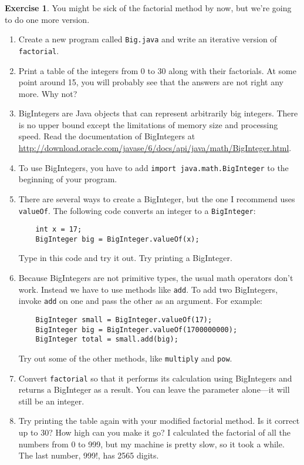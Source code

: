 \documentclass[12pt]{book}
\theoremstyle{definition}
\newtheorem{excz}{Exercise}[chapter]
\newenvironment{exercise}{\bigskip\begin{excz}\mbox{}}{\end{excz}}
\begin{document}
\begin{exercise}
\label{ex.biginteger}
You might be sick of the factorial
method by now, but we're going to do one more version.

\begin{enumerate}

\item Create a new program called {\tt Big.java} and
write an iterative version of {\tt factorial}.

\item Print a table of the integers from 0 to 30 along with their
factorials.  At some point around 15, you will probably see
that the answers are not right any more.  Why not?

\item BigIntegers are Java objects that can represent arbitrarily big
  integers.  There is no upper bound except the limitations of memory
  size and processing speed.  Read the documentation of BigIntegers at
  \url{http://download.oracle.com/javase/6/docs/api/java/math/BigInteger.html}.

\item To use BigIntegers, you have to add {\tt import
java.math.BigInteger} to the beginning of your program.

\item There are several ways to create a
BigInteger, but the one I recommend uses {\tt valueOf}.
The following code converts an integer to a {\tt BigInteger}:

\begin{lstlisting}
    int x = 17;
    BigInteger big = BigInteger.valueOf(x);
\end{lstlisting}

Type in this code and try it out.  Try printing a BigInteger.

\item Because BigIntegers are not primitive types,
the usual math operators don't work.  Instead we
have to use methods like {\tt add}.  To
add two BigIntegers, invoke {\tt add} on one
and pass the other as an argument.  For example:

\begin{lstlisting}
    BigInteger small = BigInteger.valueOf(17); 
    BigInteger big = BigInteger.valueOf(1700000000); 
    BigInteger total = small.add(big);
\end{lstlisting}

Try out some of the other methods, like {\tt multiply} and
{\tt pow}.

\item Convert {\tt factorial} so that it performs its calculation
using BigIntegers and returns a BigInteger as a result.
You can leave the parameter alone---it will still be an integer.

\item Try printing the table again with your modified factorial
method.  Is it correct up to 30?  How high can you make it go?  I
calculated the factorial of all the numbers from 0 to 999, but my
machine is pretty slow, so it took a while.  The last number, 999!,
has 2565 digits.

\end{enumerate}
\end{exercise}
\end{document}
